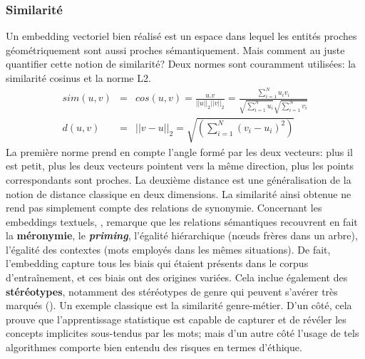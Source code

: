\documentclass[french]{article}
\begin{document}
			\subsubsection{Similarité}
				Un embedding vectoriel bien réalisé est un espace dans lequel les entités proches géométriquement sont aussi proches sémantiquement. Mais comment au juste quantifier cette notion de similarité? Deux normes sont couramment utilisées: la similarité cosinus et la norme L2.
				\begin{eqnarray*}
					sim(u, v) &=& cos(u, v) = \frac{u.v}{||u||_2 ||v||_2} = \frac{\sum_{i = 1}^{N}u_iv_i}{\sqrt{\sum_{i = 1}^N u_i} \sqrt{\sum_{i = 1}^N v_i}}\\
					d(u, v) &=& ||v-u||_2 = \sqrt{\left(\sum_{i = 1}^N (v_i-u_i)^2\right)} 
				\end{eqnarray*}
				La première norme prend en compte l'angle formé par les deux vecteurs: plus il est petit, plus les deux vecteurs pointent vers la même direction, plus les points correspondants sont proches. La deuxième distance est une généralisation de la notion de distance classique en deux dimensions. La similarité ainsi obtenue ne rend pas simplement compte des relations de synonymie. Concernant les embeddings textuels, \cite{erk2012}, remarque que les relations sémantiques recouvrent en fait la \textbf{méronymie}, le \textit{\textbf{priming}}, l'égalité hiérarchique (nœuds frères dans un arbre), l'égalité des contextes (mots employés dans les mêmes situations). De fait, l'embedding capture tous les biais qui étaient présents dans le corpus d'entraînement, et ces biais ont des origines variées. Cela inclue également des \textbf{stéréotypes}, notamment des stéréotypes de genre qui peuvent s'avérer très marqués (\cite{bolukbasi2016}). Un exemple classique est la similarité genre-métier. D'un côté, cela prouve que l'apprentissage statistique est capable de capturer et de révéler les concepts implicites sous-tendus par les mots; mais d'un autre côté l'usage de tels algorithmes comporte bien entendu des risques en termes d'éthique.
				
				
				
\end{document}
